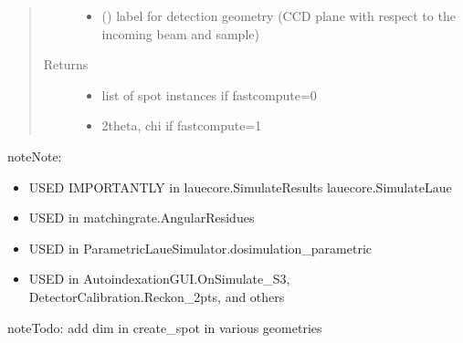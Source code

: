 \documentclass[letterpaper,10pt,english]{sphinxmanual}
\begin{document}
\begin{fulllineitems}
\begin{quote}
\begin{description}
\begin{itemize}
\item {} 
 () \textendash{} label for detection geometry (CCD plane with respect to the incoming beam and sample)

\end{itemize}

\item[{Returns}] \leavevmode
\begin{itemize}
\item {} 
list of spot instances if fastcompute=0

\item {} 
2theta, chi          if fastcompute=1

\end{itemize}


\end{description}\end{quote}

\begin{sphinxadmonition}{note}{Note:}\begin{itemize}
\item {} 
USED IMPORTANTLY in lauecore.SimulateResults  lauecore.SimulateLaue

\item {} 
USED in matchingrate.AngularResidues

\item {} 
USED in ParametricLaueSimulator.dosimulation\_parametric

\item {} 
USED in AutoindexationGUI.OnSimulate\_S3, DetectorCalibration.Reckon\_2pts, and others

\end{itemize}
\end{sphinxadmonition}

\begin{sphinxadmonition}{note}{\label{Simulation_Module:index-0}Todo:}
add dim in create\_spot in various geometries
\end{sphinxadmonition}

\end{fulllineitems}

\end{document}
